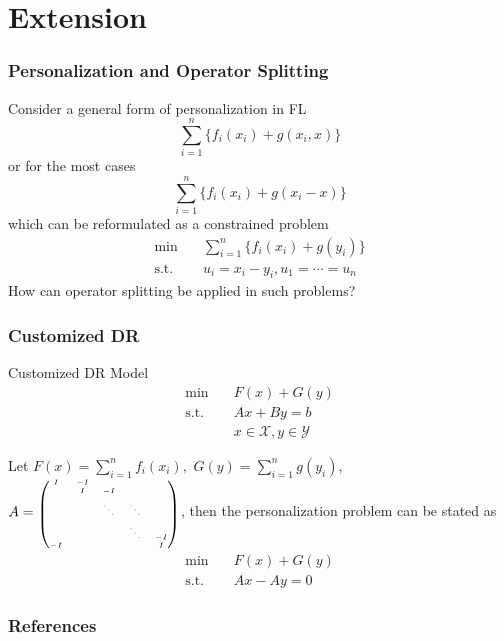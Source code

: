 
\section{Extension}


\begin{frame}
\frametitle{Personalization and Operator Splitting}

Consider a general form of personalization in FL
$$\sum_{i=1}^n \{ f_i(x_i) + g(x_i,x) \}$$
or for the most cases
$$\sum_{i=1}^n \{ f_i(x_i) + g(x_i-x) \}$$
which can be reformulated as a constrained problem
\begin{align*}
    \min & \quad \sum_{i=1}^n \{ f_i(x_i) + g(y_i) \} \\
    \text{s.t.} & \quad u_i = x_i-y_i, u_1 = \cdots = u_n
\end{align*}
How can operator splitting be applied in such problems?

\end{frame}


\begin{frame}
\frametitle{Customized DR}

\begin{block}{Customized DR Model}
\vspace{-1em}
\begin{align*}
\text{min} & \quad F(x) + G(y) \\
\text{s.t.} & \quad Ax + By = b \\
& \quad x \in \mathcal{X}, y \in \mathcal{Y}
\end{align*}
\end{block}

Let $F(x) = \sum_{i=1}^n f_i(x_i),$ $G(y) = \sum_{i=1}^n g(y_i)$, $A = \text{{\smaller[5]$\begin{pmatrix} I & -I & & & \\ & I & -I & & \\ & & \ddots & \ddots & \\ & & & \ddots & -I \\ -I & & & & I \end{pmatrix}$}}$, then the personalization problem can be stated as
\begin{align*}
\text{min} & \quad F(x) + G(y) \\
\text{s.t.} & \quad Ax - Ay = 0
\end{align*}

\end{frame}


\begin{frame}[allowframebreaks]
\frametitle{References}

{\footnotesize


}

\end{frame}




